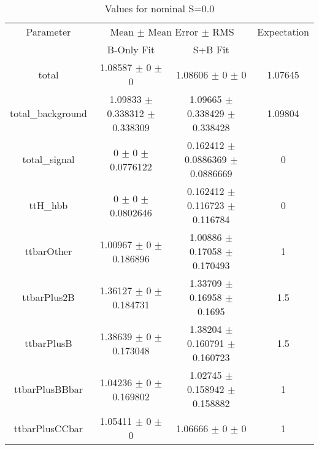 \begin{table}
\centering
\caption{Values for nominal S=0.0}
\begin{tabular}{cccc}
\toprule
Parameter & \multicolumn{2}{c}{Mean $\pm$ Mean Error $\pm$ RMS} & Expectation\\
 & B-Only Fit & S+B Fit & \\
\midrule
total & \num{1.08587} $\pm$ \num{0} $\pm$ \num{0} & \num{1.08606} $\pm$ \num{0} $\pm$ \num{0} & \num{1.07645}\\
total\_background & \num{1.09833} $\pm$ \num{0.338312} $\pm$ \num{0.338309} & \num{1.09665} $\pm$ \num{0.338429} $\pm$ \num{0.338428} & \num{1.09804}\\
total\_signal & \num{0} $\pm$ \num{0} $\pm$ \num{0.0776122} & \num{0.162412} $\pm$ \num{0.0886369} $\pm$ \num{0.0886669} & \num{0}\\
ttH\_hbb & \num{0} $\pm$ \num{0} $\pm$ \num{0.0802646} & \num{0.162412} $\pm$ \num{0.116723} $\pm$ \num{0.116784} & \num{0}\\
ttbarOther & \num{1.00967} $\pm$ \num{0} $\pm$ \num{0.186896} & \num{1.00886} $\pm$ \num{0.17058} $\pm$ \num{0.170493} & \num{1}\\
ttbarPlus2B & \num{1.36127} $\pm$ \num{0} $\pm$ \num{0.184731} & \num{1.33709} $\pm$ \num{0.16958} $\pm$ \num{0.1695} & \num{1.5}\\
ttbarPlusB & \num{1.38639} $\pm$ \num{0} $\pm$ \num{0.173048} & \num{1.38204} $\pm$ \num{0.160791} $\pm$ \num{0.160723} & \num{1.5}\\
ttbarPlusBBbar & \num{1.04236} $\pm$ \num{0} $\pm$ \num{0.169802} & \num{1.02745} $\pm$ \num{0.158942} $\pm$ \num{0.158882} & \num{1}\\
ttbarPlusCCbar & \num{1.05411} $\pm$ \num{0} $\pm$ \num{0} & \num{1.06666} $\pm$ \num{0} $\pm$ \num{0} & \num{1}\\
\bottomrule
\end{tabular}
\end{table}